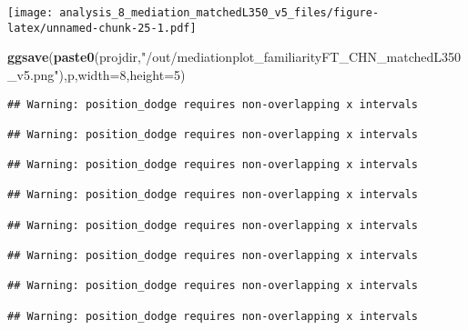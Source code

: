\documentclass[
]{article}
\newenvironment{Shaded}{\begin{snugshade}}{\end{snugshade}}
\newcommand{\DataTypeTok}[1]{\textcolor[rgb]{0.13,0.29,0.53}{#1}}
\newcommand{\DecValTok}[1]{\textcolor[rgb]{0.00,0.00,0.81}{#1}}
\newcommand{\KeywordTok}[1]{\textcolor[rgb]{0.13,0.29,0.53}{\textbf{#1}}}
\newcommand{\NormalTok}[1]{#1}
\newcommand{\StringTok}[1]{\textcolor[rgb]{0.31,0.60,0.02}{#1}}
\begin{document}
\texttt{[image: analysis\_8\_mediation\_matchedL350\_v5\_files/figure-latex/unnamed-chunk-25-1.pdf]}

\begin{Shaded}
\begin{Highlighting}[]
\KeywordTok{ggsave}\NormalTok{(}\KeywordTok{paste0}\NormalTok{(projdir,}\StringTok{"/out/mediationplot_familiarityFT_CHN_matchedL350_v5.png"}\NormalTok{),p,}\DataTypeTok{width=}\DecValTok{8}\NormalTok{,}\DataTypeTok{height=}\DecValTok{5}\NormalTok{)}
\end{Highlighting}
\end{Shaded}

\begin{verbatim}
## Warning: position_dodge requires non-overlapping x intervals

## Warning: position_dodge requires non-overlapping x intervals

## Warning: position_dodge requires non-overlapping x intervals

## Warning: position_dodge requires non-overlapping x intervals

## Warning: position_dodge requires non-overlapping x intervals

## Warning: position_dodge requires non-overlapping x intervals

## Warning: position_dodge requires non-overlapping x intervals

## Warning: position_dodge requires non-overlapping x intervals
\end{verbatim}
\end{document}
